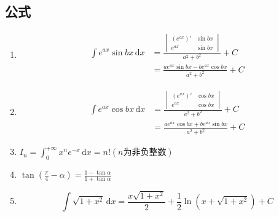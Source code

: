 \documentclass[a4paper,12pt]{article}
\begin{document}
    \subsection{公式}

    \begin{enumerate}
        \item
        \[
            \begin{aligned}
                \int e^{ax} \sin bx \,\mathrm{d}x
                &=
                \frac{
                    \begin{vmatrix}
                    (e^{ax})
                        '      & \sin bx \\
                        e^{ax} & \sin bx
                    \end{vmatrix}
                }{a^2 + b^2}
                + C  \\[6pt]
                &=
                \frac{a e^{ax} \sin bx - b e^{ax} \cos bx}{a^2 + b^2}
                + C
            \end{aligned}
        \]

        \item
        \[
            \begin{aligned}
                \int e^{ax} \cos bx \,\mathrm{d}x
                &=
                \frac{
                    \begin{vmatrix}
                    (e^{ax})
                        '      & \cos bx \\
                        e^{ax} & \cos bx
                    \end{vmatrix}
                }{a^2 + b^2}
                + C \\[6pt]
                &=
                \frac{a e^{ax} \cos bx + b e^{ax} \sin bx}{a^2 + b^2}
                + C
            \end{aligned}
        \]
        \item $I_n = \displaystyle\int_0^{+\infty} x^ne^{-x}\,\mathrm{d}x = n!(n\text{为非负整数})$
        \item $\tan (\displaystyle\frac{\pi}{4} - \alpha) = \displaystyle\frac{1 - \tan \alpha}{1 + \tan \alpha}$
        \item
        \[
            \int \sqrt{1+x^2}\,\mathrm{d}x
            =
            \frac{x\sqrt{1+x^2}}{2}
            +
            \frac{1}{2}\ln\!\left(x+\sqrt{1+x^2}\right)
            + C
        \]

    \end{enumerate}
\end{document}
